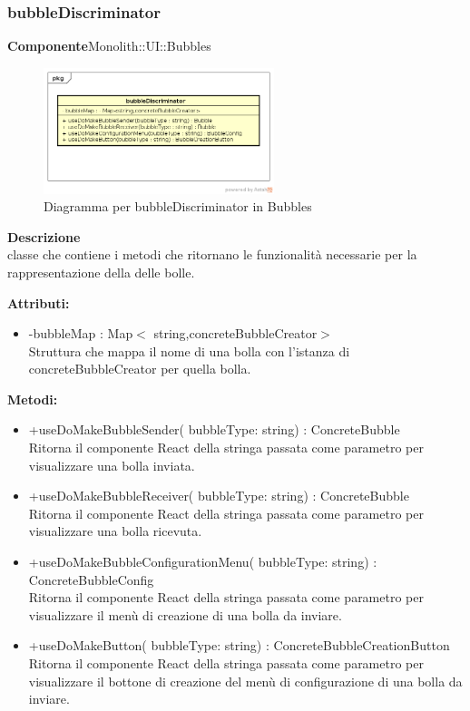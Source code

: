 \subsubsection{bubbleDiscriminator}
\textbf{Componente}Monolith::UI::Bubbles\\
   \FloatBarrier
   \begin{figure}[ht]
   \centering
   \includegraphics[width=0.6\textwidth]{img/single-bubbleDiscriminator}
   \caption{{Diagramma per bubbleDiscriminator in Bubbles}}
\end{figure}
\FloatBarrier
\textbf{Descrizione}\\
classe che contiene i metodi che ritornano le funzionalità necessarie per la rappresentazione della delle bolle.

\textbf{Attributi:}
\begin{itemize}\item -bubbleMap : Map$<$ string,concreteBubbleCreator$>$ \\Struttura che mappa il nome di una bolla con l'istanza di concreteBubbleCreator per quella bolla.\end{itemize}
\textbf{Metodi:} \begin{itemize}\item +useDoMakeBubbleSender( bubbleType: string) : ConcreteBubble \\Ritorna il componente React della stringa passata come parametro per visualizzare una bolla inviata.\item +useDoMakeBubbleReceiver( bubbleType: string) : ConcreteBubble \\Ritorna il componente React della stringa passata come parametro per visualizzare una bolla ricevuta.\item +useDoMakeBubbleConfigurationMenu( bubbleType: string) : ConcreteBubbleConfig \\Ritorna il componente React della stringa passata come parametro per visualizzare il menù di creazione di una bolla da inviare.\item  +useDoMakeButton( bubbleType: string) : ConcreteBubbleCreationButton \\ Ritorna il componente React della stringa passata come parametro per visualizzare il bottone di creazione del menù di configurazione di una bolla da inviare.

\end{itemize} 


